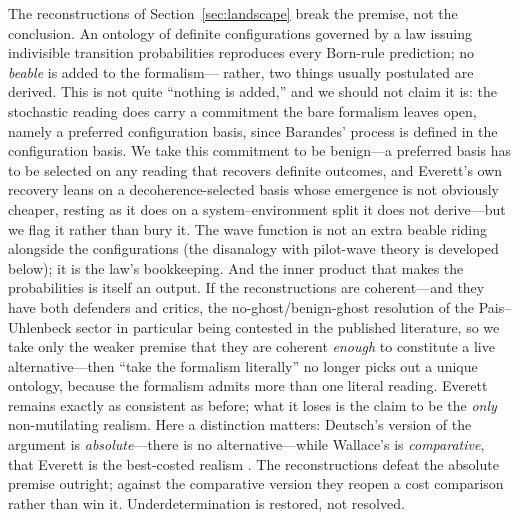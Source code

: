 \documentclass[11pt]{article}
\theoremstyle{remark}
\begin{document}
The reconstructions of Section~\ref{sec:landscape} break the premise,
not the conclusion. An ontology of definite configurations governed by
a law issuing indivisible transition probabilities reproduces every
Born-rule prediction; no \emph{beable} is added to the formalism---%
rather, two things usually postulated are derived. This is not quite
``nothing is added,'' and we should not claim it is: the stochastic
reading does carry a commitment the bare formalism leaves open, namely
a preferred configuration basis, since Barandes' process is defined in
the configuration basis. We take this commitment to be benign---a
preferred basis has to be selected on any reading that recovers
definite outcomes, and Everett's own recovery leans on a
decoherence-selected basis whose emergence is not obviously cheaper,
resting as it does on a system--environment split it does not
derive---but we flag it rather than bury it. The wave function is not an extra beable riding
alongside the configurations (the disanalogy with pilot-wave theory is
developed below); it is the law's bookkeeping. And the inner product
that makes the probabilities is itself an output. If the
reconstructions are coherent---and they have both defenders and
critics, the no-ghost/benign-ghost resolution of the Pais--Uhlenbeck
sector in particular being contested in the published literature, so we
take only the weaker premise that they are coherent \emph{enough} to
constitute a live alternative---then ``take the formalism literally''
no longer picks out a unique ontology, because the formalism admits
more than one literal reading. Everett remains exactly as consistent as
before; what it loses is the claim to be the \emph{only} non-mutilating
realism. Here a distinction matters: Deutsch's version of the argument
is \emph{absolute}---there is no alternative---while Wallace's is
\emph{comparative}, that Everett is the best-costed realism
\cite{Deutsch1996,Wallace2012}. The reconstructions defeat the
absolute premise outright; against the comparative version they reopen
a cost comparison rather than win it. Underdetermination is restored,
not resolved.
\end{document}
